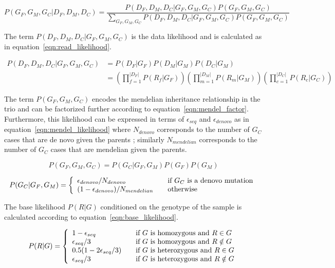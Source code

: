 \documentclass{article}
\begin{document}
\begin{equation}\label{eqn:model}
P(G_F,G_M,G_C|D_F,D_M,D_C) =  \frac{P(D_F,D_M,D_C|G_F,G_M,G_C)P(G_F,G_M,G_C)}{\sum_{G_F,G_M,G_C}P(D_F,D_M,D_C|G_F,G_M,G_C)P(G_F,G_M,G_C)}
\end{equation}

\noindent
The term $P(D_F,D_M,D_C|G_F,G_M,G_C)$ is the data likelihood and is calculated as in equation~\ref{eqn:read_likelihood}.

\begin{align}\label{eqn:read_likelihood}
P(D_F,D_M,D_C|G_F,G_M,G_C) &= P(D_F|G_F)P(D_M|G_M)P(D_C|G_M) \\
	&= \left(\prod_{f=1}^{|D_F|}P(R_f|G_F)\right)\left(\prod_{m=1}^{|D_M|}P(R_m|G_M)\right)\left(\prod_{c=1}^{|D_C|}P(R_c|G_C)\right)
\end{align}

\noindent
The term $P(G_F,G_M,G_C)$ encodes the mendelian inheritance relationship in the trio and can be factorized further according to equation~\ref{eqn:mendel_factor}. Furthermore, this likelihood can be expressed in terms of $\epsilon_{seq}$ and $\epsilon_{denovo}$ as in equation~\ref{eqn:mendel_likelihood} where $N_{denovo}$ corresponds to the number of $G_C$ cases that are de novo given the parents ; similarly $N_{mendelian}$ corresponds to the number of $G_C$ cases that are mendelian given the parents.

\begin{equation}\label{eqn:mendel_factor}
P(G_F,G_M,G_C) = P(G_C|G_F,G_M)P(G_F)P(G_M)
\end{equation}

\begin{equation}
\label{eqn:mendel_likelihood}
 P(G_C|G_F,G_M) = \left\{
  \begin{array}{l l}
    \epsilon_{denovo}/N_{denovo} & \quad \text{if $G_C$ is a denovo mutation}\\
    (1-\epsilon_{denovo})/N_{mendelian} & \quad \text{otherwise}
  \end{array} \right.
\end{equation}

\vspace{1em}
The base likelihood $P(R|G)$ conditioned on the genotype of the sample is calculated according to equation~\ref{eqn:base_likelihood}.

\begin{equation}
\label{eqn:base_likelihood}
P(R|G) = \left\{
  \begin{array}{l l}
    1-\epsilon_{seq} & \quad \text{if $G$ is homozygous and $R \in G$}\\
    \epsilon_{seq}/3 & \quad \text{if $G$ is homozygous and $R \notin G$}\\
      0.5(1-2\epsilon_{seq}/3) & \quad \text{if $G$ is heterozygous and $R \in G$}\\
    \epsilon_{seq}/3 & \quad \text{if $G$ is heterozygous and $R \notin G$}
  \end{array} \right.
\end{equation}
\end{document}
